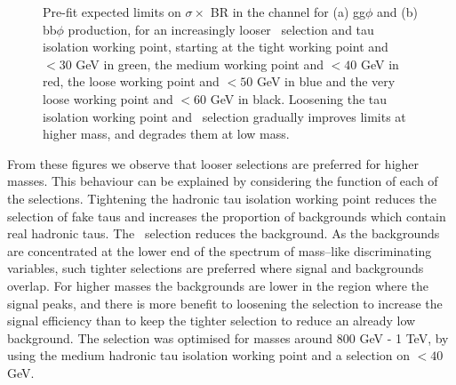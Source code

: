\begin{figure}[h!]
\begin{center}
\end{center}
\caption[Pre-fit expected limits on $\sigma \times$ BR for the gg$\phi$ and bb$\phi$
processes
in the
\mutau channel for an increasingly looser \mT~selection and tau isolation
working point.]{Pre-fit expected limits on $\sigma \times$ BR in the \mutau channel for (a) gg$\phi$ and
(b) bb$\phi$ production, for an increasingly looser \mT~selection and tau isolation working point, starting
at the tight working point and \mT$<30$ GeV in green, the medium working point and \mT$<40$ GeV in red,
the loose working point and \mT$<50$ GeV in blue and the very loose working point and \mT$<60$ GeV in black. Loosening
the tau isolation working point and \mT~selection gradually improves limits at higher mass, and
degrades them at low mass.}
\label{fig:mssm_gradcuts_mt}
\end{figure}

From these figures
we observe that looser selections are preferred for higher masses. This behaviour can be
explained by considering the function of each of the selections. Tightening the hadronic
tau isolation working point reduces the selection of fake taus and increases the proportion
of backgrounds which contain real hadronic taus. The \mT~selection reduces
the \Wjets background. As the backgrounds are concentrated at the lower
end of the spectrum of mass--like discriminating variables, such tighter
selections are preferred where signal and backgrounds overlap. For higher masses the
backgrounds are lower in the region where the signal peaks,
and there is more benefit to loosening the selection
to increase the signal efficiency than to keep the tighter selection
to reduce an already low background.
The selection was optimised for masses around 800 GeV - 1 TeV, by
using the medium hadronic tau isolation working point and a selection on \mT$<40$ GeV.


